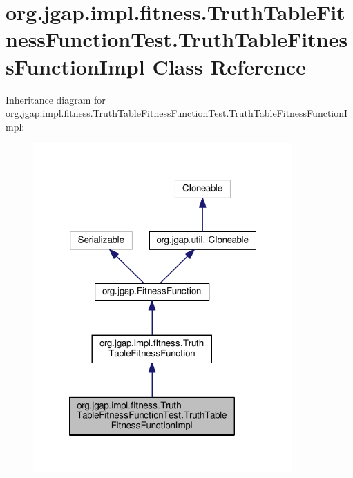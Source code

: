 \hypertarget{classorg_1_1jgap_1_1impl_1_1fitness_1_1_truth_table_fitness_function_test_1_1_truth_table_fitness_function_impl}{\section{org.\-jgap.\-impl.\-fitness.\-Truth\-Table\-Fitness\-Function\-Test.\-Truth\-Table\-Fitness\-Function\-Impl Class Reference}
\label{classorg_1_1jgap_1_1impl_1_1fitness_1_1_truth_table_fitness_function_test_1_1_truth_table_fitness_function_impl}
}


Inheritance diagram for org.\-jgap.\-impl.\-fitness.\-Truth\-Table\-Fitness\-Function\-Test.\-Truth\-Table\-Fitness\-Function\-Impl\-:
\nopagebreak
\begin{figure}[H]
\begin{center}
\leavevmode
\includegraphics[width=281pt]{classorg_1_1jgap_1_1impl_1_1fitness_1_1_truth_table_fitness_function_test_1_1_truth_table_fitness_function_impl__inherit__graph}
\end{center}
\end{figure}


